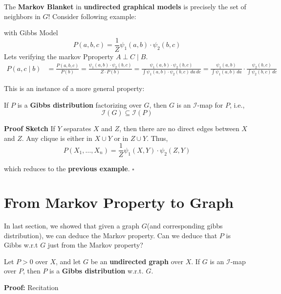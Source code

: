 \documentclass{article}%
\begin{document}
The \textbf{Markov Blanket} in \textbf{undirected graphical models} is precisely the set of neighbors in \( G \)! Consider following example:
\begin{center}
\end{center}
with Gibbs Model
\[
P(a,b,c) = \frac{1}{Z} \psi_1(a,b) \cdot \psi_2(b,c)
\]
Lets verifying the markov Pproperty \( A \perp C \mid B \).
\begin{align*}
P(a,c \mid b) &= \frac{P(a,b,c)}{P(b)} = \frac{\psi_1(a,b) \cdot \psi_2(b,c)}{Z \cdot P(b)}= \frac{\psi_1(a,b) \cdot \psi_2(b,c)}{\int \psi_1(a,b) \cdot \psi_2(b,c) \, da \, dc}= \frac{\psi_1(a,b)}{\int \psi_1(a,b) \, da} \cdot \frac{\psi_2(b,c)}{\int \psi_2(b,c) \, dc}
\end{align*}


This is an instance of a more general property:

\begin{theorem}
    If \( P \) is a \textbf{Gibbs distribution} factorizing over \( G \), then \( G \) is an \(\mathcal{I}\)-map for \( P \), i.e.,
\[
\mathcal{I}(G) \subseteq \mathcal{I}(P)
\]
\end{theorem}

\textbf{Proof Sketch}
If \( Y \) separates \( X \) and \( Z \), then there are no direct edges between \( X \) and \( Z \). Any clique is either in \( X \cup Y \) or in \( Z \cup Y \).
Thus,
\[
P(X_1, \dots, X_n) = \frac{1}{Z} \psi_1(X,Y) \cdot \psi_2(Z,Y)
\]

which reduces to the \textbf{previous example}. \(\square\)

\section{From Markov Property to Graph}
In last section, we showed that given a graph \( G \)(and corresponding gibbs distribution), we can deduce the Markov property. Can we deduce that \( P \) is Gibbs w.r.t \( G \) just from the Markov property?

\begin{theorem}
Let \( P > 0 \) over \( X \), and let \( G \) be an \textbf{undirected graph} over \( X \). If \( G \) is an \(\mathcal{I}\)-map over \( P \), then \( P \) is a \textbf{Gibbs distribution} w.r.t. \( G \).
\end{theorem}
\textbf{Proof: }Recitation
\end{document}
